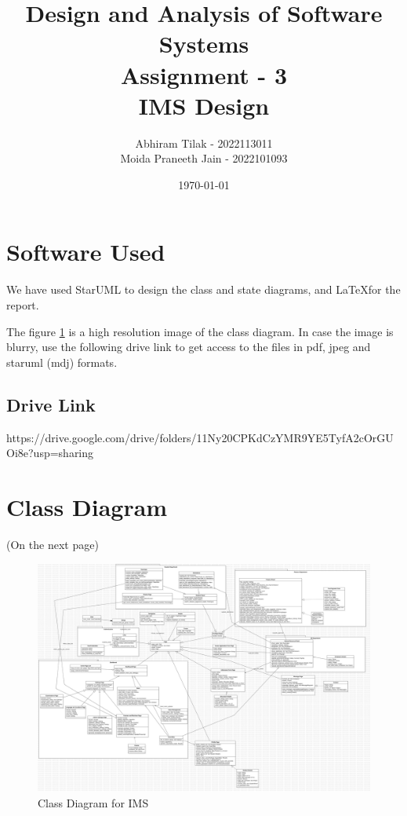 \documentclass[11pt]{article}
\title{ Design and Analysis of Software Systems \\ Assignment - 3 \\ IMS Design}
\author{ Abhiram Tilak - 2022113011 \\ Moida Praneeth Jain - 2022101093 }
\date{\today}
\begin{document}
\maketitle

\section{Software Used}

We have used StarUML to design the class and state diagrams,
and \LaTeX  for the report.

The figure \ref{class} is a high resolution image of the class diagram. In case the image is blurry, 
use the following drive link to get access to the files in pdf, jpeg and staruml (mdj) formats.

\subsection{Drive Link}
https://drive.google.com/drive/folders/11Ny20CPKdCzYMR9YE5TyfA2cOrGUOi8e?usp=sharing


\section{Class Diagram}

(On the next page)

\pagebreak

\begin{figure}[!ht]
    \center
\includegraphics[width=8in,angle=90]{class_diagram/Main.png}
\caption{Class Diagram for IMS}
\label{class}
\end{figure}

\pagebreak
\end{document}

